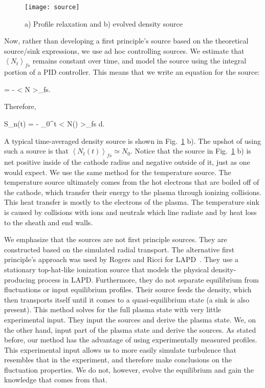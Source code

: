 \begin{figure}[!htbp]
\texttt{[image: source]}
\hfil
\caption{a) Profile relaxation and b) evolved density source}
\label{source}
\end{figure}


Now, rather than developing a first principle's source based on the theoretical source/sink expressions, we use ad hoc controlling sources. 
We estimate that $\left< N_t \right>_{fs}$ remains constant over time, and model the source using the integral
portion of a PID controller. This means that we write an equation for the source:

\beq
\label{Sn_eq}
 = - \left< N \right>_{fs}.
\eeq

Therefore,

\beq
\label{Sn_eq2}
S_n(t) = - \int_0^t \left< N(\tau) \right>_{fs} d\tau.
\eeq

A typical time-averaged density source is shown in Fig.~\ref{source} b).
The upshot of using such a source is that $\left< N_t(t) \right>_{fs} \simeq N_0$. Notice that the source in Fig.~\ref{source} b) is net positive inside of the cathode radius and negative
outside of it, just as one would expect.
We use the same method for the temperature source. The temperature source ultimately comes from the hot electrons that are boiled off of
the cathode, which transfer their energy to the plasma through ionizing collisions. This heat transfer is mostly to the electrons of the plasma. The temperature sink is caused by collisions
with ions and neutrals which line radiate and by heat loss to the sheath and end walls.

We emphasize that the sources are not first principle sources. They are constructed based on the simulated radial transport. The alternative first principle's approach was used by Rogers and Ricci
for LAPD~\cite{rogers2010}. They use a stationary top-hat-like ionization source that models the physical density-producing process in LAPD. 
Furthermore, they do not separate equilibrium from fluctuations or input equilibrium profiles. Their source feeds the density, which then transports itself until it comes to a quasi-equilibrium state
(a sink is also present). This method solves for the full plasma state with very little experimental input. 
They input the sources and derive the plasma state. We, on the other hand, input part of the plasma
state and derive the sources. As stated before, our method has the advantage of using experimentally measured profiles. 
This experimental input allows us to more easily simulate turbulence that resembles that
in the experiment, and therefore make conclusions on the fluctuation properties. We do not, however, evolve the equilibrium and gain the knowledge that comes from that.


